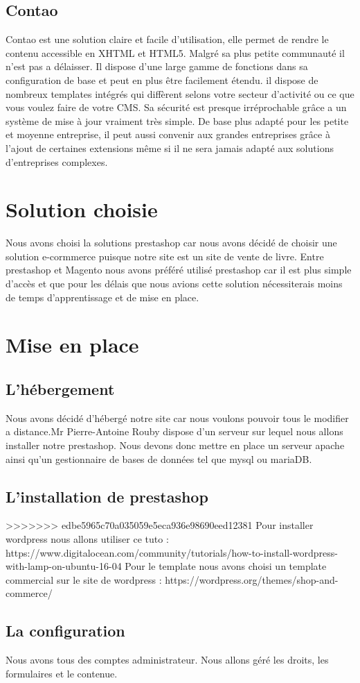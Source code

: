 \documentclass[a4paper,12pt]{report}
\begin{document}
\section{Contao}

Contao est une solution claire et facile d'utilisation, elle permet de
rendre le contenu accessible en XHTML et HTML5. Malgré sa plus petite
communauté il n'est pas a délaisser.  Il dispose d'une large gamme de
fonctions dans sa configuration de base et peut en plus être
facilement étendu. il dispose de nombreux templates intégrés qui
diffèrent selons votre secteur d'activité ou ce que vous voulez faire
de votre CMS.  Sa sécurité est presque irréprochable grâce a un
système de mise à jour vraiment très simple. De base plus adapté pour
les petite et moyenne entreprise, il peut aussi convenir aux grandes
entreprises grâce à l'ajout de certaines extensions même si il ne sera
jamais adapté aux solutions d'entreprises complexes.

\chapter{Solution choisie}

Nous avons choisi la solutions prestashop car nous avons décidé de choisir
une solution e-cormmerce puisque notre site est un site de vente de livre.
Entre prestashop et Magento nous avons préféré utilisé prestashop car il est
plus simple d'accès et que pour les délais que nous avions cette solution
nécessiterais moins de temps d'apprentissage et de mise en place.

\chapter{Mise en place}
\section{L'hébergement}
Nous avons décidé d’hébergé notre site car nous voulons pouvoir tous le
modifier a distance.Mr Pierre-Antoine Rouby dispose d'un serveur sur lequel
nous allons installer notre prestashop. Nous devons donc mettre en place
un serveur apache ainsi qu'un gestionnaire de bases de données tel que mysql ou mariaDB.

\section{L'installation de prestashop}

>>>>>>> edbe5965c70a035059e5eca936e98690eed12381
Pour installer wordpress nous allons utiliser ce tuto :
https://www.digitalocean.com/community/tutorials/how-to-install-wordpress-with-lamp-on-ubuntu-16-04
Pour le template nous avons choisi un template commercial sur le site
de wordpress : https://wordpress.org/themes/shop-and-commerce/

\section{La configuration}
Nous avons tous des comptes administrateur.
Nous allons géré les droits, les formulaires et le contenue. 
\end{document}
